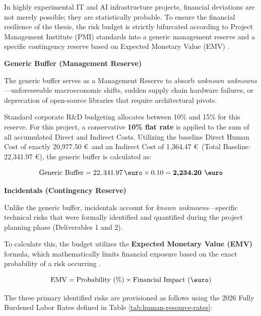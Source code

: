 In highly experimental IT and AI infrastructure projects, financial deviations are not merely possible; they are statistically probable. To ensure the financial resilience of the thesis, the risk budget is strictly bifurcated according to Project Management Institute (PMI) standards into a generic management reserve and a specific contingency reserve based on Expected Monetary Value (EMV) \cite{pmbok_guide}.

\textbf{Generic Buffer (Management Reserve)}

The generic buffer serves as a Management Reserve to absorb \textit{unknown unknowns}—unforeseeable macroeconomic shifts, sudden supply chain hardware failures, or deprecation of open-source libraries that require architectural pivots. 

Standard corporate R\&D budgeting allocates between 10\% and 15\% for this reserve. For this project, a conservative \textbf{10\% flat rate} is applied to the sum of all accumulated Direct and Indirect Costs. Utilizing the baseline Direct Human Cost of exactly 20,977.50 \euro\ and an
Indirect Cost of 1,364.47 \euro\ (Total Baseline: 22,341.97 \euro), the
generic buffer is calculated as:

\begin{equation}
    \text{Generic Buffer} = 22,341.97 \, \text{\euro} \times 0.10 = \textbf{2,234.20 \euro}
\end{equation}

\textbf{Incidentals (Contingency Reserve)}

Unlike the generic buffer, incidentals account for \textit{known unknowns}—specific technical risks that were formally identified and quantified during the project planning phase (Deliverables 1 and 2). 

To calculate this, the budget utilizes the \textbf{Expected Monetary Value (EMV)} formula, which mathematically limits financial exposure based on the exact probability of a risk occurring \cite{pmbok_guide}.

\begin{equation}
    \text{EMV} = \text{Probability (\%)} \times \text{Financial Impact (\euro)}
\end{equation}

The three primary identified risks are provisioned as follows using the 2026 Fully Burdened Labor Rates defined in Table \ref{tab:human-resource-rates}:

